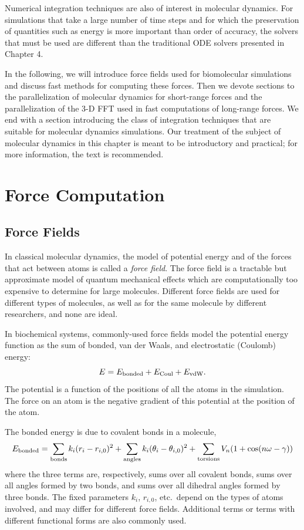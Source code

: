 Numerical integration techniques are also of interest in molecular
dynamics.  For simulations that take a large number of time steps and
for which the preservation of quantities such as energy is more important
than order of accuracy, the solvers that must be used are different than
the traditional ODE solvers presented in Chapter 4.

In the following, we will introduce force fields used for biomolecular
simulations and discuss fast methods for computing these forces.
Then we devote sections to the parallelization of molecular dynamics for
short-range forces and the parallelization of the 3-D FFT used in fast
computations of long-range forces.  We end with a section introducing
the class of integration techniques that are suitable for molecular
dynamics simulations.  Our treatment of the subject of molecular dynamics
in this chapter is meant to be introductory and practical; for more
information, the text \cite{frenkel-smit} is recommended.


\section{Force Computation}

\subsection{Force Fields}

In classical molecular dynamics, the model of potential energy and of the
forces that act between atoms is called a {\em force field}.  The force
field is a tractable but approximate model of quantum mechanical effects
which are computationally too expensive to determine for large molecules.
Different force fields are used for different types of molecules, as well
as for the same molecule by different researchers, and none are ideal.

In biochemical systems, commonly-used force fields model the potential energy function 
as the sum of bonded, van der Waals, and electrostatic (Coulomb) energy:
\[
E = E_{\rm bonded} + E_{\rm Coul} + E_{\rm vdW}.
\]
The potential is a function of the positions of all the atoms in the simulation.
The force on an atom is the negative gradient of this potential at the 
position of the atom.  

The bonded energy is due to covalent bonds in a molecule,
\[
E_{\rm bonded} = \sum_{\rm bonds} k_i (r_i - r_{i,0})^2 + 
                 \sum_{\rm angles} k_i ( \theta_i - \theta_{i,0})^2 +
                 \sum_{\rm torsions} V_n(1+\cos(n \omega - \gamma))
\]
where the three terms are, respectively,
sums over all covalent bonds, sums over all angles formed by two bonds, and
sums over all dihedral angles formed by three bonds.  The fixed parameters 
$k_i$, $r_{i,0}$, etc.\ depend on the types of atoms involved, and
may differ for different force fields.  Additional terms or terms with
different functional forms are also commonly used.

